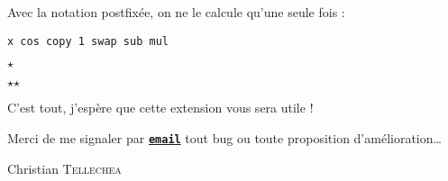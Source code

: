 \documentclass[a4paper,10pt]{article}
\newcommand\mywidth{0.85\linewidth}
\begin{document}
Avec la notation postfixée, on ne le calcule qu'une seule fois :
\begin{center}
\begin{minipage}{\mywidth}
\begin{lstlisting}
x cos copy 1 swap sub mul
\end{lstlisting}
\end{minipage}
\end{center}

\bigskip
\begin{center}
$\star$\par
$\star$\quad$\star$
\end{center}

\bigskip
C'est tout, j'espère que cette extension vous sera utile !\par\nobreak
Merci de me signaler par \href{mailto:unbonpetit@gmail.com}{\texttt{\textbf{email}}} tout bug ou toute proposition d'amélioration\ldots\par\nobreak\bigskip
Christian \textsc{Tellechea}
\end{document}
